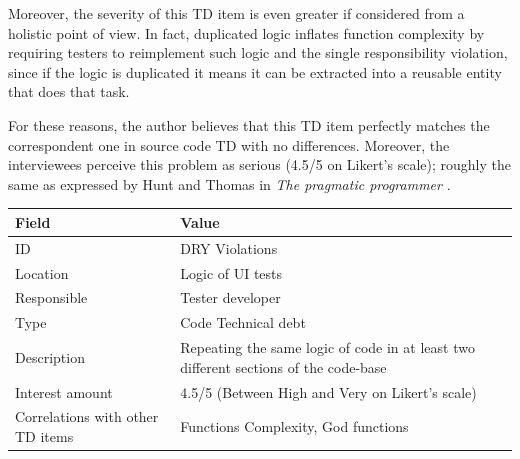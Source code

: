         \label{sec:disc-rq3-dry}
        Moreover, the severity of this TD item is even greater if considered from a holistic point of view. In fact, duplicated logic inflates function complexity by requiring testers to reimplement such logic and the single responsibility violation, since if the logic is duplicated it means it can be extracted into a reusable entity that does that task.

        For these reasons, the author believes that this TD item perfectly matches the correspondent one in source code TD with no differences. Moreover, the interviewees perceive this problem as serious (4.5/5 on Likert's scale); roughly the same as expressed by Hunt and Thomas in \textit{The pragmatic programmer} \cite{thomas1999pragmatic}.


    	\begin{table}[!htbp]
		\centering
		\tabulinesep=1.2mm
		\begin{tabu} to \textwidth {|X|X[3]|}

			\hline
			\textbf{Field} & \textbf{Value} \\
			\hline

			ID & DRY Violations \\
			\hline

			Location & Logic of UI tests \\
			\hline

			Responsible & Tester developer \\
			\hline

			Type & Code Technical debt \\
			\hline

			Description & Repeating the same logic of code in at least two different sections of the code-base\\
			\hline



			Interest amount &  4.5/5 (Between High and Very on Likert's scale) \\
			\hline



			Correlations with other TD items & Functions Complexity, God functions\\
			\hline


\end{tabu}
\end{table}
